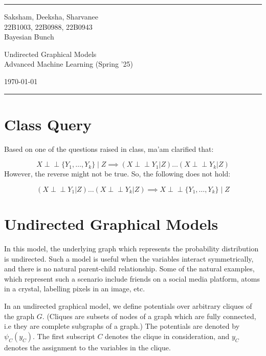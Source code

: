 \documentclass[a4paper]{article}
\begin{document}

\fancyhead[C]{}
\hrule \medskip %
\begin{minipage}{0.295\textwidth} 
\raggedright
\footnotesize
Saksham, Deeksha, Sharvanee  \hfill\\   
22B1003, 22B0988, 22B0943\hfill\\
Bayesian Bunch
\end{minipage}
\begin{minipage}{0.4\textwidth} 
\centering 
\large 
Undirected Graphical Models\\ 
\normalsize 
Advanced Machine Learning (Spring '25)\\ 
\end{minipage}
\begin{minipage}{0.295\textwidth} 
\raggedleft
\today\hfill\\
\end{minipage}
\medskip\hrule 
\bigskip
\section{Class Query}
Based on one of the questions raised in class, ma'am clarified that:

\[X \perp\!\!\!\perp \{Y_1, \dots, Y_k\} \mid Z\implies (X \perp\!\!\!\perp Y_1 | Z) \dots (X \perp\!\!\!\perp Y_k | Z)\]
However, the reverse might not be true. So, the following does not hold:

\[(X \perp\!\!\!\perp Y_1 | Z)  \dots  (X \perp\!\!\!\perp Y_k | Z) \implies X \perp\!\!\!\perp \{Y_1, \dots, Y_k\} \mid Z\]


\section{Undirected Graphical Models}
In this model, the underlying graph which represents the probability distribution is undirected. Such a model is useful when the variables interact symmetrically, and there is no natural parent-child relationship. Some of the natural examples, which represent such a scenario include friends on a social media platform, atoms in a crystal, labelling pixels in an image, etc.

In an undirected graphical model, we define potentials over arbitrary cliques of the graph $G$. (Cliques are subsets of nodes of a graph which are fully connected, i.e they are complete subgraphs of a graph.) The potentials are denoted by $\psi_C(y_C)$. The first subscript $C$ denotes the clique in consideration, and $y_C$ denotes the assignment to the variables in the clique.
\end{document}
